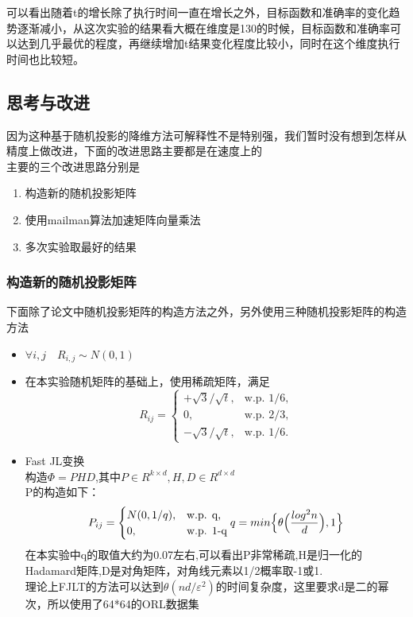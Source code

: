 \documentclass{ctexart}
\begin{document}
    可以看出随着t的增长除了执行时间一直在增长之外，目标函数和准确率的变化趋势逐渐减小，从这次实验的结果看大概在维度是130的时候，目标函数和准确率可以达到几乎最优的程度，再继续增加t结果变化程度比较小，同时在这个维度执行时间也比较短。

    \subsection{思考与改进}
    因为这种基于随机投影的降维方法可解释性不是特别强，我们暂时没有想到怎样从精度上做改进，下面的改进思路主要都是在速度上的\\
    主要的三个改进思路分别是
    \begin{enumerate}
    \item 构造新的随机投影矩阵
    \item 使用mailman算法加速矩阵向量乘法
    \item 多次实验取最好的结果
    \end{enumerate}

    \subsubsection{构造新的随机投影矩阵}
    下面除了论文中随机投影矩阵的构造方法之外，另外使用三种随机投影矩阵的构造方法
    \begin{itemize}
    \item $\forall i,j \quad R_{i,j} \sim N(0,1)$
    \item 在本实验随机矩阵的基础上，使用稀疏矩阵，满足
    \begin{equation*}
    R_{ij} = \begin{cases} +\sqrt{3}/\sqrt{t},& \mbox{w.p. 1/6,} \\0, & \mbox{w.p. 2/3,} \\ -\sqrt{3}/\sqrt{t}, & \mbox{w.p. 1/6.}\end{cases}
    \end{equation*}
    \item Fast JL变换\\
    构造$\Phi = PHD$,其中$P \in R^{k \times d}, H,D \in R^{d \times d}$\\
    P的构造如下：
    \begin{equation*}
    P_{ij} = \begin{cases} N(0,1/q),& \mbox{w.p. q,} \\0, & \mbox{w.p. 1-q}\end{cases}\\
    q = min\Bigl\{ \theta \Bigl(\frac{log^2 n}{d}\Bigr),1 \Bigr\}
    \end{equation*}
    在本实验中q的取值大约为0.07左右,可以看出P非常稀疏,H是归一化的Hadamard矩阵,D是对角矩阵，对角线元素以1/2概率取-1或1.\\
    理论上FJLT的方法可以达到$\theta(nd/\varepsilon^2)$的时间复杂度，这里要求d是二的幂次，所以使用了64*64的ORL数据集
    \end{itemize}
\end{document}
